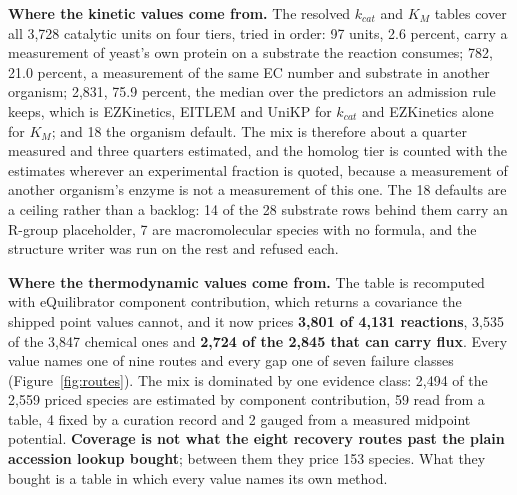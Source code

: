 \textbf{Where the kinetic values come from.} The resolved $k_{cat}$ and $K_M$ tables cover
all 3{,}728 catalytic units on four tiers, tried in order: 97 units, 2.6 percent, carry a
measurement of yeast's own protein on a substrate the reaction consumes; 782, 21.0 percent,
a measurement of the same EC number and substrate in another organism; 2{,}831, 75.9
percent, the median over the predictors an admission rule keeps, which is EZKinetics, EITLEM
and UniKP for $k_{cat}$ and EZKinetics alone for $K_M$; and 18 the organism default. The
mix is therefore about a quarter measured and three quarters estimated, and the homolog tier
is counted with the estimates wherever an experimental fraction is quoted, because a
measurement of another organism's enzyme is not a measurement of this one. The 18 defaults
are a ceiling rather than a backlog: 14 of the 28 substrate rows behind them carry an
R-group placeholder, 7 are macromolecular species with no formula, and the structure writer
was run on the rest and refused each.

\textbf{Where the thermodynamic values come from.} The table is recomputed with eQuilibrator
component contribution, which returns a covariance the shipped point values cannot, and it
now prices \textbf{3{,}801 of 4{,}131 reactions}, 3{,}535 of the 3{,}847 chemical ones and
\textbf{2{,}724 of the 2{,}845 that can carry flux}. Every value names one of nine routes
and every gap one of seven failure classes (Figure~\ref{fig:routes}). The mix is dominated
by one evidence class: 2{,}494 of the 2{,}559 priced species are estimated by component
contribution, 59 read from a table, 4 fixed by a curation record and 2 gauged from a
measured midpoint potential. \textbf{Coverage is not what the eight recovery routes past the
plain accession lookup bought}; between them they price 153 species. What they bought is a
table in which every value names its own method.


